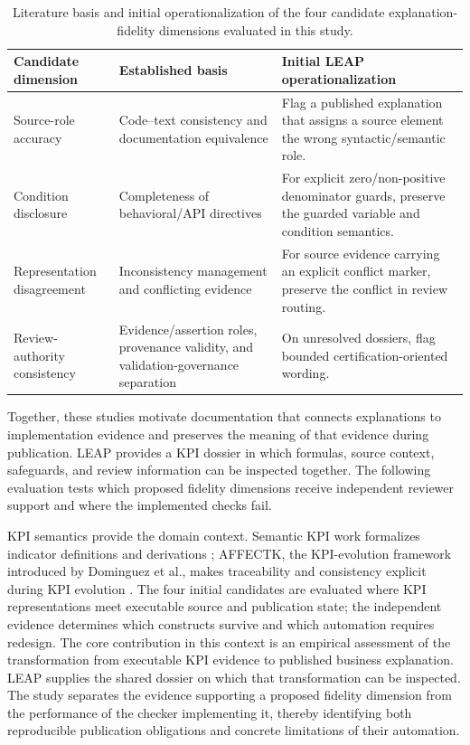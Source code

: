 \documentclass[a4paper,fleqn]{cas-dc}
\begin{document}
\begin{table}[t]
\centering
\caption{Literature basis and initial operationalization of the four candidate explanation-fidelity dimensions evaluated in this study.}
\label{tab:contract}
\begin{tabularx}{\textwidth}{@{}lYY@{}}
\toprule
Candidate dimension & Established basis & Initial LEAP operationalization \\
\midrule
Source-role accuracy & Code--text consistency and documentation equivalence \citep{Wen2019,Xu2024,Eghbali2026} & Flag a published explanation that assigns a source element the wrong syntactic/semantic role. \\
Condition disclosure & Completeness of behavioral/API directives \citep{Eghbali2026,Zhou2017} & For explicit zero/non-positive denominator guards, preserve the guarded variable and condition semantics. \\
Representation disagreement & Inconsistency management and conflicting evidence \citep{Nuseibeh2001,Brush2016} & For source evidence carrying an explicit conflict marker, preserve the conflict in review routing. \\
Review-authority consistency & Evidence/assertion roles, provenance validity, and validation-governance separation \citep{Giglio2019,W3CProvConstraints2013,Sadiq2026} & On unresolved dossiers, flag bounded certification-oriented wording. \\
\bottomrule
\end{tabularx}
\end{table}

Together, these studies motivate documentation that connects explanations to implementation evidence and preserves the meaning of that evidence during publication. LEAP provides a KPI dossier in which formulas, source context, safeguards, and review information can be inspected together. The following evaluation tests which proposed fidelity dimensions receive independent reviewer support and where the implemented checks fail.

KPI semantics provide the domain context. Semantic KPI work formalizes indicator definitions and derivations \citep{Mate2017,RoldanGarcia2021,Diamantini2025}; AFFECTK, the KPI-evolution framework introduced by Dominguez et al., makes traceability and consistency explicit during KPI evolution \citep{Dominguez2025}. The four initial candidates are evaluated where KPI representations meet executable source and publication state; the independent evidence determines which constructs survive and which automation requires redesign. The core contribution in this context is an empirical assessment of the transformation from executable KPI evidence to published business explanation. LEAP supplies the shared dossier on which that transformation can be inspected. The study separates the evidence supporting a proposed fidelity dimension from the performance of the checker implementing it, thereby identifying both reproducible publication obligations and concrete limitations of their automation.
\end{document}
